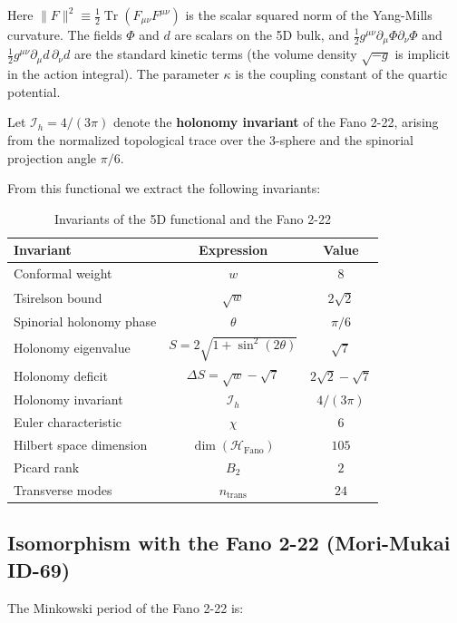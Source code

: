 \documentclass[12pt]{article}
\numberwithin{equation}{section}
\begin{document}
Here \(\|F\|^2 \equiv \frac{1}{2} \operatorname{Tr}(F_{\mu\nu} F^{\mu\nu})\) is the scalar squared norm of the Yang-Mills curvature. The fields \(\Phi\) and \(d\) are scalars on the 5D bulk, and \(\frac{1}{2} g^{\mu\nu}\partial_\mu \Phi \partial_\nu \Phi\) and \(\frac{1}{2} g^{\mu\nu}\partial_\mu d \,\partial_\nu d\) are the standard kinetic terms (the volume density \(\sqrt{-g}\) is implicit in the action integral). The parameter \(\kappa\) is the coupling constant of the quartic potential.

Let \(\mathcal{I}_h = 4/(3\pi)\) denote the \textbf{holonomy invariant} of the Fano 2-22, arising from the normalized topological trace over the 3-sphere and the spinorial projection angle \(\pi/6\).

From this functional we extract the following invariants:

\begin{table}[h]
\centering
\caption{Invariants of the 5D functional and the Fano 2-22}
\label{tab:invariants}
\begin{tabular}{lcc}
\toprule
\textbf{Invariant} & \textbf{Expression} & \textbf{Value} \\
\midrule
Conformal weight & \(w\) & \(8\) \\
Tsirelson bound & \(\sqrt{w}\) & \(2\sqrt{2}\) \\
Spinorial holonomy phase & \(\theta\) & \(\pi/6\) \\
Holonomy eigenvalue & \(S = 2\sqrt{1+\sin^2(2\theta)}\) & \(\sqrt{7}\) \\
Holonomy deficit & \(\Delta S = \sqrt{w} - \sqrt{7}\) & \(2\sqrt{2} - \sqrt{7}\) \\
Holonomy invariant & \(\mathcal{I}_h\) & \(4/(3\pi)\) \\
Euler characteristic & \(\chi\) & \(6\) \\
Hilbert space dimension & \(\dim(\mathcal{H}_{\text{Fano}})\) & \(105\) \\
Picard rank & \(B_2\) & \(2\) \\
Transverse modes & \(n_{\text{trans}}\) & \(24\) \\
\hline
\end{tabular}
\end{table}

\subsection{Isomorphism with the Fano 2-22 (Mori-Mukai ID-69)}

The Minkowski period of the Fano 2-22 is:
\end{document}

